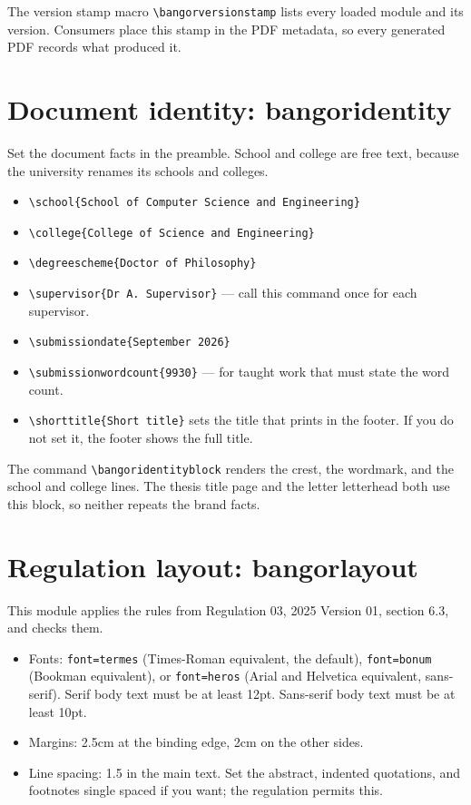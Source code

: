 \documentclass[a4paper,12pt]{article}
\begin{document}
The version stamp macro \verb|\bangorversionstamp| lists every loaded
module and its version. Consumers place this stamp in the PDF metadata,
so every generated PDF records what produced it.

\section{Document identity: bangoridentity}
Set the document facts in the preamble. School and college are free
text, because the university renames its schools and colleges.

\begin{itemize}
  \item \verb|\school{School of Computer Science and Engineering}|
  \item \verb|\college{College of Science and Engineering}|
  \item \verb|\degreescheme{Doctor of Philosophy}|
  \item \verb|\supervisor{Dr A. Supervisor}| --- call this command once
        for each supervisor.
  \item \verb|\submissiondate{September 2026}|
  \item \verb|\submissionwordcount{9930}| --- for taught work that must state the
        word count.
  \item \verb|\shorttitle{Short title}| sets the title that prints in the
        footer. If you do not set it, the footer shows the full title.
\end{itemize}

The command \verb|\bangoridentityblock| renders the crest, the
wordmark, and the school and college lines. The thesis title page and
the letter letterhead both use this block, so neither repeats the brand
facts.

\section{Regulation layout: bangorlayout}
This module applies the rules from Regulation 03, 2025 Version 01,
section 6.3, and checks them.

\begin{itemize}
  \item Fonts: \verb|font=termes| (Times-Roman equivalent, the default),
        \verb|font=bonum| (Bookman equivalent), or \verb|font=heros| (Arial
        and Helvetica equivalent, sans-serif). Serif body text must be at least
        12pt. Sans-serif body text must be at least 10pt.
  \item Margins: 2.5cm at the binding edge, 2cm on the other sides.
  \item Line spacing: 1.5 in the main text. Set the abstract, indented
        quotations, and footnotes single spaced if you want; the regulation
        permits this.
\end{itemize}
\end{document}
